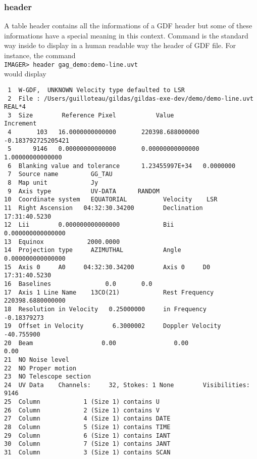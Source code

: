 \subsubsection{\uv{} header}

A \uv{} table header contains all the informations of a GDF header but some
of these informations have a special meaning in this context. Command
 is the standard way inside \gildas{} to display in a human
readable way the header of GDF file. For instance, the command \\
\texttt{IMAGER> header gag\_demo:demo-line.uvt}  \\
would display
\begin{verbatim}
 1  W-GDF,  UNKNOWN Velocity type defaulted to LSR
 2  File : /Users/guilloteau/gildas/gildas-exe-dev/demo/demo-line.uvt  REAL*4
 3  Size        Reference Pixel           Value                  Increment       
 4       103   16.0000000000000       220398.688000000     -0.183792725205421
 5      9146   0.00000000000000       0.00000000000000       1.00000000000000
 6  Blanking value and tolerance      1.23455997E+34   0.0000000
 7  Source name         GG_TAU
 8  Map unit            Jy
 9  Axis type           UV-DATA      RANDOM
10  Coordinate system   EQUATORIAL          Velocity    LSR
11  Right Ascension   04:32:30.34200        Declination       17:31:40.5230
12  Lii        0.000000000000000            Bii       0.000000000000000
13  Equinox            2000.0000
14  Projection type     AZIMUTHAL           Angle     0.000000000000000
15  Axis 0     A0     04:32:30.34200        Axis 0     D0     17:31:40.5230
16  Baselines               0.0       0.0
17  Axis 1 Line Name    13CO(21)            Rest Frequency   220398.6880000000
18  Resolution in Velocity   0.25000000     in Frequency        -0.18379273
19  Offset in Velocity        6.3000002     Doppler Velocity     -40.755900
20  Beam                   0.00                0.00                 0.00
21  NO Noise level
22  NO Proper motion
23  NO Telescope section
24  UV Data    Channels:     32, Stokes: 1 None        Visibilities:        9146
25  Column            1 (Size 1) contains U           
26  Column            2 (Size 1) contains V           
27  Column            4 (Size 1) contains DATE        
28  Column            5 (Size 1) contains TIME        
29  Column            6 (Size 1) contains IANT        
30  Column            7 (Size 1) contains JANT        
31  Column            3 (Size 1) contains SCAN        
\end{verbatim}
